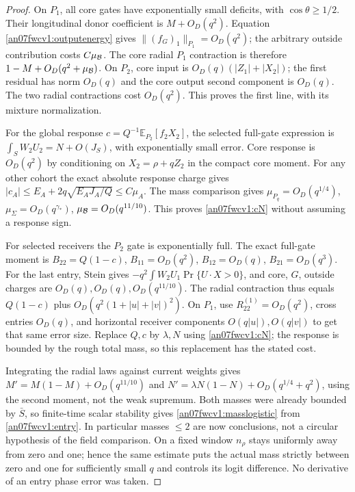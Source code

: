 \documentclass[11pt]{article}
\numberwithin{equation}{section}
\newcommand{\E}{\mathbb E}\newcommand{\dd}{\,d}
\begin{document}
\begin{proof}
On \(P_1\), all core gates have exponentially small deficits,
with \(\cos\theta\ge1/2\). Their longitudinal donor coefficient
is \(M+O_D(q^2)\). Equation \eqref{an07fwcv1:outputenergy}
gives \(\|(f_G)_1\|_{P_1}=O_D(q^2)\);
the arbitrary outside contribution costs \(C\mu_\mathcal B\).
The core radial \(P_1\) contraction is therefore
\(1-M+O_D(q^2+\mu_\mathcal B)\). On \(P_2\), core input is
\(O_D(q)(|Z_1|+|X_2|)\); the first residual has norm \(O_D(q)\)
and the core output second component is \(O_D(q)\).
The two radial contractions cost \(O_D(q^2)\). This proves
the first line, with its mixture normalization.

For the global response \(c=Q^{-1}\E_{P_2}[f_2X_2]\),
the selected full-gate expression is
\(\int_S W_2U_2=N+O(J_S)\), with exponentially small error.
Core response is \(O_D(q^2)\) by conditioning on
\(X_2=\rho+qZ_2\) in the compact core moment.
For any other cohort the exact absolute response charge gives
\(|c_A|\le E_A+2q\sqrt{E_AJ_A/Q}\le C\mu_A\).
The mass comparison gives \(\mu_{P_q}=O_D(q^{1/4})\),
\(\mu_\Sigma=O_D(q^{\gamma_*})\), \(\mu_\mathcal B=O_D(q^{11/10})\).
This proves \eqref{an07fwcv1:cN} without assuming a response sign.

For selected receivers the \(P_2\) gate is exponentially full.
The exact full-gate moment is \(B_{22}=Q(1-c)\),
\(B_{11}=O_D(q^2)\), \(B_{12}=O_D(q)\),
\(B_{21}=O_D(q^3)\). For the last entry, Stein gives
\(-q^2\int W_2U_1\Pr\{U\cdot X>0\}\), and core,
\(G\), outside charges are \(O_D(q),O_D(q),O_D(q^{11/10})\).
The radial contraction thus equals \(Q(1-c)\) plus
\(O_D(q^2(1+|u|+|v|)^2)\). On \(P_1\), use
\(R_{22}^{(1)}=O_D(q^2)\), cross entries \(O_D(q)\),
and horizontal receiver components \(O(q|u|),O(q|v|)\)
to get that same error size. Replace \(Q,c\) by \(\lambda,N\)
using \eqref{an07fwcv1:cN}; the response is bounded by the
rough total mass, so this replacement has the stated cost.

Integrating the radial laws against current weights gives
\(M'=M(1-M)+O_D(q^{11/10})\) and
\(N'=\lambda N(1-N)+O_D(q^{1/4}+q^2)\), using the second
moment, not the weak supremum. Both masses were already bounded
by \(\bar S\), so finite-time scalar stability gives
\eqref{an07fwcv1:masslogistic} from \eqref{an07fwcv1:entry}.
In particular masses \(\le2\) are now conclusions, not a
circular hypothesis of the field comparison. On a fixed window
\(n_\rho\) stays uniformly away from zero and one; hence the
same estimate puts the actual mass strictly between zero and one
for sufficiently small \(q\) and controls its logit difference. No derivative of
an entry phase error was taken.
\end{proof}
\end{document}
